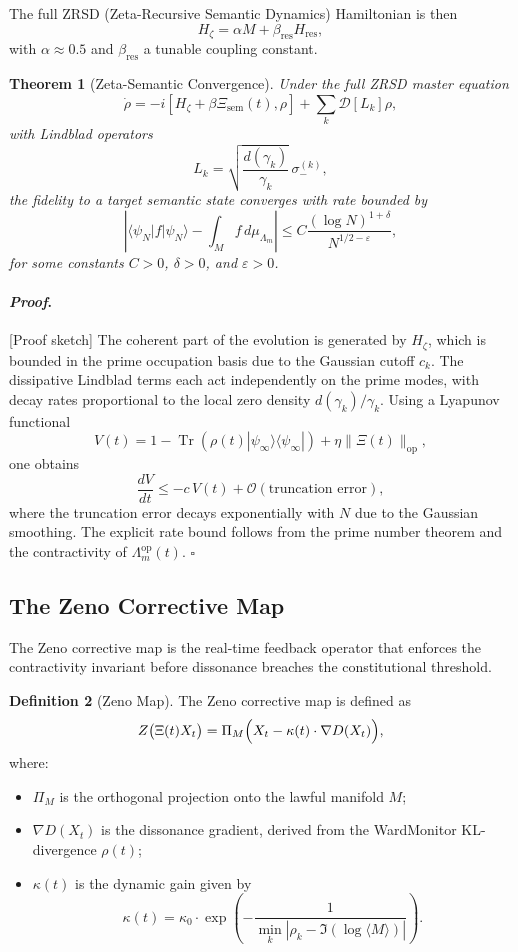\documentclass[12pt]{article}
\theoremstyle{plain}
\newtheorem{theorem}{Theorem}[section]
\theoremstyle{definition}
\newtheorem{definition}[theorem]{Definition}
\theoremstyle{remark}
\renewenvironment{proof}{\paragraph{\textit{Proof}.}}{\hfill$\square$}
\begin{document}
The full ZRSD (Zeta-Recursive Semantic Dynamics) Hamiltonian is then
\[
H_\zeta = \alpha M + \beta_{\text{res}} H_{\text{res}},
\]
with $\alpha \approx 0.5$ and $\beta_{\text{res}}$ a tunable coupling constant.

\begin{theorem}[Zeta-Semantic Convergence]
Under the full ZRSD master equation
\[
\dot{\rho} = -i[H_\zeta + \beta\Xi_{\text{sem}}(t), \rho] + \sum_k \mathcal{D}[L_k]\rho,
\]
with Lindblad operators
\[
L_k = \sqrt{\frac{d(\gamma_k)}{\gamma_k}}\, \sigma_-^{(k)},
\]
the fidelity to a target semantic state converges with rate bounded by
\[
\left|\langle \psi_N | f | \psi_N \rangle - \int_M f\, d\mu_{\Lambda_m}\right|
\leq C \frac{(\log N)^{1+\delta}}{N^{1/2 - \varepsilon}},
\]
for some constants $C > 0$, $\delta > 0$, and $\varepsilon > 0$.
\end{theorem}

\begin{proof}[Proof sketch]
The coherent part of the evolution is generated by $H_\zeta$, which is bounded in the prime occupation basis due to the Gaussian cutoff $c_k$. The dissipative Lindblad terms each act independently on the prime modes, with decay rates proportional to the local zero density $d(\gamma_k)/\gamma_k$. Using a Lyapunov functional
\[
V(t) = 1 - \operatorname{Tr}(\rho(t) |\psi_\infty\rangle\langle\psi_\infty|) + \eta\|\Xi(t)\|_{\text{op}},
\]
one obtains
\[
\frac{dV}{dt} \leq -c\, V(t) + \mathcal{O}(\text{truncation error}),
\]
where the truncation error decays exponentially with $N$ due to the Gaussian smoothing. The explicit rate bound follows from the prime number theorem and the contractivity of $\Lambda_m^{\text{op}}(t)$.
\end{proof}

\subsection{The Zeno Corrective Map}

The Zeno corrective map is the real-time feedback operator that enforces the contractivity invariant before dissonance breaches the constitutional threshold.

\begin{definition}[Zeno Map]
The Zeno corrective map is defined as
\[
Z\bigl(\Xi(t)X_t\bigr) = \Pi_M\Bigl( X_t - \kappa(t)\cdot \nabla D(X_t) \Bigr),
\]
where:
\begin{itemize}
    \item $\Pi_M$ is the orthogonal projection onto the lawful manifold $M$;
    \item $\nabla D(X_t)$ is the dissonance gradient, derived from the WardMonitor KL-divergence $\rho(t)$;
    \item $\kappa(t)$ is the dynamic gain given by
    \[
    \kappa(t) = \kappa_0 \cdot \exp\!\left( -\frac{1}{\min_k |\rho_k - \Im(\log \langle M \rangle)|} \right).
    \]
\end{itemize}
\end{definition}
\end{document}
